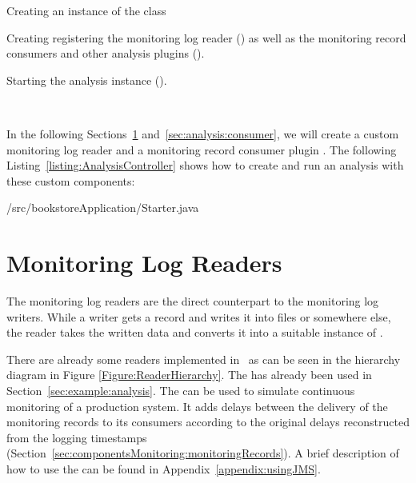 \begin{compactenum}
\item Creating an instance of the  class
\item Creating registering the monitoring log reader () as %
well as the monitoring record consumers and other analysis plugins ().
\item Starting the analysis instance ().
\end{compactenum}

\

\noindent In the following Sections~\ref{sec:analysis:reader} and~\ref{sec:analysis:consumer}, %
we will create a custom monitoring log reader  and a %
monitoring record consumer plugin . %
\noindent The following Listing~\ref{listing:AnalysisController} shows how to create and run an analysis %
with these custom components:

\setJavaCodeListing
%
{\customComponentsBookstoreApplicationDir/src/bookstoreApplication/Starter.java}

\section{Monitoring Log Readers}\label{sec:analysis:reader}

The monitoring log readers are the direct counterpart to the monitoring log writers. While a writer gets a record and writes it into files or somewhere else, the reader takes the written data and converts it into a suitable instance of . 

% 
% 

\noindent There are already some readers implemented in \Kieker\  as can be seen in the hierarchy diagram in Figure \ref{Figure:ReaderHierarchy}. %
The  has already been used in Section~\ref{sec:example:analysis}. %
The  can be used to simulate continuous monitoring of a %
production system. It adds delays between the delivery of the monitoring records %
to its consumers according to the original delays reconstructed from the logging %
timestamps (Section~\ref{sec:componentsMonitoring:monitoringRecords}).
A brief description of how to use the  can be found in Appendix~\ref{appendix:usingJMS}. %

